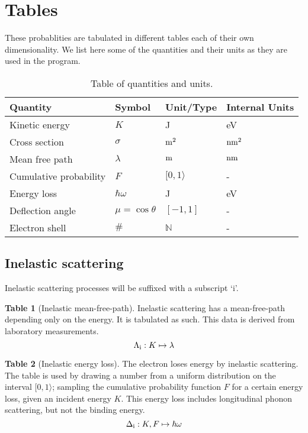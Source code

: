 \documentclass{article}
\theoremstyle{definition}
\newtheorem{data-table}{Table}
\begin{document}
\section{Tables}
These probablities are tabulated in different tables each of their own dimensionality. We list here some of the quantities and their units as they are used in the program.

\begin{table}[h]
    \centering
    \begin{tabular}{llll}
        Quantity               & Symbol              & Unit/Type      & Internal Units \\
        \hline
        Kinetic energy         & $K$                 & J              & eV \\ 
        Cross section          & $\sigma$            & ${\rm m}^{2}$  & ${\rm nm}^{2}$ \\
        Mean free path         & $\lambda$           & ${\rm m}$      & ${\rm nm}$ \\
        Cumulative probability & $F$                 & $[0, 1\rangle$ & - \\
        Energy loss            & $\hbar\omega$       & J              & eV \\
        Deflection angle       & $\mu = \cos \theta$ & $[-1, 1]$      & - \\
        Electron shell         & $\#$                & $\mathbb{N}$   & - \\
    \end{tabular}
    \caption{Table of quantities and units.}
\end{table}

\subsection{Inelastic scattering}
Inelastic scattering processes will be suffixed with a subscript `i'.

\begin{data-table}[Inelastic mean-free-path]
    Inelastic scattering has a mean-free-path depending only on the energy. It is tabulated as such. This data is derived from laboratory measurements.
    \[{\Lambda}_{\rm i}: K \mapsto \lambda\]
\end{data-table}

\begin{data-table}[Inelastic energy loss]
    The electron loses energy by inelastic scattering. The table is used by drawing a number from a uniform distribution on the interval $[0, 1\rangle$; sampling the cumulative probability function $F$ for a certain energy loss, given an incident energy $K$. This energy loss includes longitudinal phonon scattering, but not the binding energy.
    \[{\Delta}_{\rm i}: K, F \mapsto \hbar\omega\]
\end{data-table}
\end{document}
